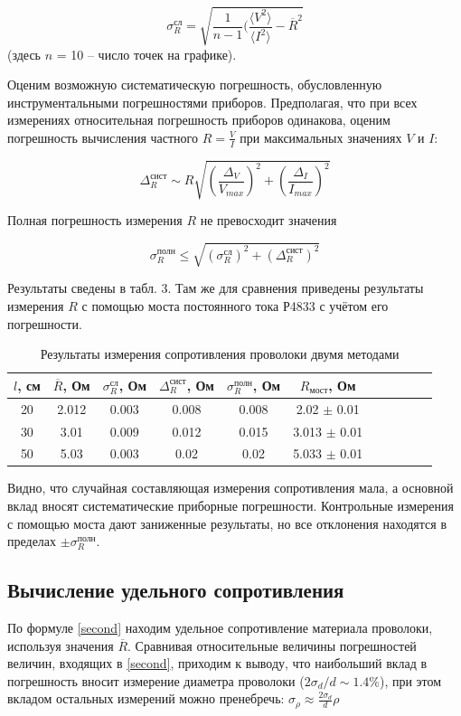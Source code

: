 \documentclass[a4paper, 12pt]{article}
\begin{document}
\[\sigma_R^\text{сл}=\sqrt{\frac{1}{n-1}(\frac{\langle V^2\rangle}{\langle I^2\rangle}-\overline{R}^2}\]
(здесь $n$ = 10 – число точек на графике).

Оценим возможную систематическую погрешность, обусловленную инструментальными
погрешностями приборов. Предполагая, что при всех измерениях относительная погрешность
приборов одинакова, оценим погрешность вычисления частного $R=\frac{V}{I}$ при максимальных
значениях $V$ и $I$:

\[\Delta^{\text{сист}}_R \sim R\sqrt{(\frac{\Delta_V}{V_{max}})^2+(\frac{\Delta_I}{I_{max}})^2}\]

Полная погрешность измерения $R$ не превосходит значения

\[\sigma_R^{\text{полн}} \leq \sqrt{(\sigma_R^\text{сл})^2 + (\Delta^{\text{сист}}_R)^2}\]

Результаты сведены в табл. 3. Там же для сравнения приведены результаты измерения $R$ с помощью моста постоянного тока Р4833 с учётом его погрешности.

\begin{table}[!h]
\begin{center}
\begin{tabular}{|c|c|c|c|c|c|c|c|c|c|c|}
\hline
$l$, см &$\overline{R}$, Ом & $\sigma_R^\text{сл}$, Ом  & $\Delta^{\text{сист}}_R$, Ом & $\sigma_R^{\text{полн}}$, Ом & $R_{\text{мост}}$, Ом \\ \hline
20 & 2.012 & 0.003 & 0.008 & 0.008 & 2.02 $\pm$ 0.01 \\ \hline
30 & 3.01 & 0.009 & 0.012 & 0.015 & 3.013 $\pm$ 0.01 \\ \hline
50 & 5.03 & 0.003 & 0.02 & 0.02 & 5.033 $\pm$ 0.01 \\ \hline
\end{tabular}
\caption{Результаты измерения сопротивления проволоки двумя методами}
\end{center}
\end{table}

Видно, что случайная составляющая измерения сопротивления мала, а основной вклад вносят систематические приборные погрешности. Контрольные измерения с помощью моста дают заниженные результаты, но все отклонения находятся в пределах $\pm \sigma^{\text{полн}}_{R}$.

\subsection*{Вычисление удельного сопротивления}

По формуле \eqref{second} находим удельное сопротивление материала проволоки, используя значения $\overline{R}$. Сравнивая относительные величины погрешностей величин, входящих в \eqref{second}, приходим к выводу, что наибольший вклад в погрешность вносит измерение диаметра проволоки ($2\sigma_d / d \sim 1.4\%$), при этом вкладом остальных измерений можно пренебречь: $\sigma_\rho\approx\frac{2\sigma_d}{d}\rho$
\end{document}
